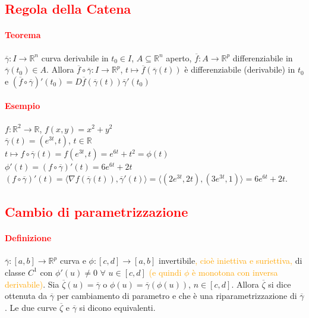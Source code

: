 \documentclass{article}
\newcommand{\R}{\mathbb{R}}
\begin{document}
\subsection{\textcolor{red}{Regola della Catena}}
\paragraph{\textcolor{red}{Teorema}}
$\overline{\gamma}: I \rightarrow \R^n$ curva derivabile in $t_0 \in I$, $A \subseteq \R^n$ aperto, $\overline{f}: A \rightarrow \R^p$ differenziabile in $\overline{\gamma}(t_0)\in A$. Allora 
$\overline{f}\circ \overline{\gamma}: I \rightarrow \R^p$, $t \mapsto \overline{f}(\overline{\gamma}(t))$ è differenziabile (derivabile) in $t_0$ e $(\overline{f}\circ \overline{\gamma})'(t_0)=D\overline{f}(\overline{\gamma}(t))\overline{\gamma}'(t_0)$

\paragraph{\textcolor{red}{Esempio}}
$f: \R^2 \rightarrow \R$, $f(x,y)=x^2+y^2$\\
$\overline{\gamma} (t)=(e^{3t},t)$, $t \in \R$\\
$t \mapsto f \circ \overline{\gamma}(t)=f(e^{3t},t)=e^{6t}+t^2=\phi(t)$\\
$\phi' (t)=(f \circ \overline{\gamma})'(t)=6e^{6t}+2t$\\
$(f \circ \overline{\gamma})'(t)=\langle\nabla f(\overline{\gamma}(t)), \overline{\gamma}'(t) \rangle= \langle (2e^{3t},2t),(3e^{3t},1)\rangle=6e^{6t}+2t$.

\subsection{\textcolor{red}{Cambio di parametrizzazione}}
\paragraph{\textcolor{red}{Definizione}}
$\overline{\gamma}:[a,b]\rightarrow \R^p$ curva e $\phi: [c,d]\rightarrow [a,b]$ invertibile\textcolor{orange}{, cioè iniettiva e suriettiva,} di classe $C^1$ con $\phi'(u)\neq 0 \,\, \forall \,\, u \in [c,d]$ \textcolor{orange}{(e quindi $\phi$ è monotona con inversa derivabile)}. Sia $\overline{\zeta}(u)=\overline{\gamma}$ o $\phi(u)=\overline{\gamma}(\phi(u))$, $n \in [c,d]$. Allora $\overline{\zeta}$ si dice ottenuta da $\overline{\gamma}$ per cambiamento di parametro e che è una riparametrizzazione di $\overline{\gamma}$. Le due curve $\overline{\zeta}$ e $\overline{\gamma}$ si dicono equivalenti.
\end{document}
